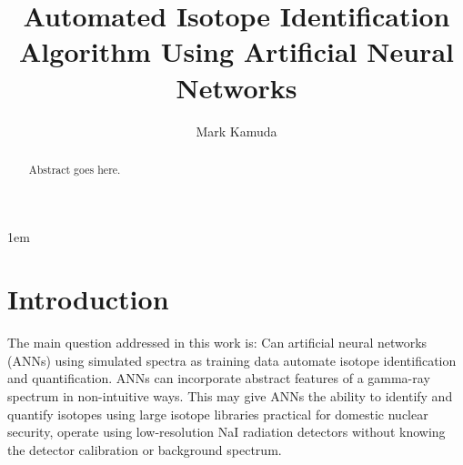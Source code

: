 \documentclass[thesis,tocnosub,noragright,centerchapter,12pt,fullpage]{uiucecethesis09}
\title{Automated Isotope Identification Algorithm Using Artificial Neural Networks}
\author{Mark Kamuda}
\begin{document}
%

%
\maketitle

\parindent 1em%

\frontmatter


\begin{abstract}
Abstract goes here.
\end{abstract}

\tableofcontents

\listoftables

\listoffigures

\mainmatter


\chapter{Introduction}

The main question addressed in this work is: Can artificial neural networks (ANNs) using simulated spectra as training data automate isotope identification and quantification. ANNs can incorporate abstract features of a gamma-ray spectrum in non-intuitive ways. This may give ANNs the ability to identify and quantify isotopes using large isotope libraries practical for domestic nuclear security, operate using low-resolution NaI radiation detectors without knowing the detector calibration or background spectrum.
\end{document}
